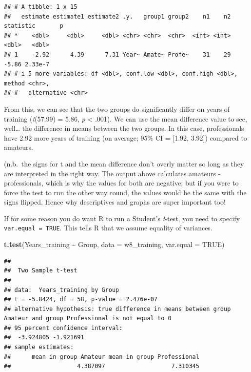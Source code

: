 \documentclass[
]{book}
\newenvironment{Shaded}{\begin{snugshade}}{\end{snugshade}}
\newcommand{\AttributeTok}[1]{\textcolor[rgb]{0.13,0.29,0.53}{#1}}
\newcommand{\ConstantTok}[1]{\textcolor[rgb]{0.56,0.35,0.01}{#1}}
\newcommand{\FunctionTok}[1]{\textcolor[rgb]{0.13,0.29,0.53}{\textbf{#1}}}
\newcommand{\NormalTok}[1]{#1}
\newcommand{\SpecialCharTok}[1]{\textcolor[rgb]{0.81,0.36,0.00}{\textbf{#1}}}
\begin{document}
\begin{verbatim}
## # A tibble: 1 x 15
##   estimate estimate1 estimate2 .y.   group1 group2    n1    n2 statistic       p
## *    <dbl>     <dbl>     <dbl> <chr> <chr>  <chr>  <int> <int>     <dbl>   <dbl>
## 1    -2.92      4.39      7.31 Year~ Amate~ Profe~    31    29     -5.86 2.33e-7
## # i 5 more variables: df <dbl>, conf.low <dbl>, conf.high <dbl>, method <chr>,
## #   alternative <chr>
\end{verbatim}

From this, we can see that the two groups do significantly differ on years of training (\emph{t}(57.99) = 5.86, \emph{p} \textless{} .001). We can use the mean difference value to see, well\ldots{} the difference in means between the two groups. In this case, professionals have 2.92 more years of training (on average; 95\% CI = {[}1.92, 3.92{]}) compared to amateurs.

(n.b.~the signs for t and the mean difference don't overly matter so long as they are interpreted in the right way. The output above calculates amateurs - professionals, which is why the values for both are negative; but if you were to force the test to run the other way round, the values would be the same with the signs flipped. Hence why descriptives and graphs are super important too!

If for some reason you do want R to run a Student's \emph{t}-test, you need to specify \texttt{var.equal\ =\ TRUE}. This tells R that we assume equality of variances.

\begin{Shaded}
\begin{Highlighting}[]
\FunctionTok{t.test}\NormalTok{(Years\_training }\SpecialCharTok{\textasciitilde{}}\NormalTok{ Group, }\AttributeTok{data =}\NormalTok{ w8\_training, }\AttributeTok{var.equal =} \ConstantTok{TRUE}\NormalTok{)}
\end{Highlighting}
\end{Shaded}

\begin{verbatim}
## 
##  Two Sample t-test
## 
## data:  Years_training by Group
## t = -5.8424, df = 58, p-value = 2.476e-07
## alternative hypothesis: true difference in means between group Amateur and group Professional is not equal to 0
## 95 percent confidence interval:
##  -3.924805 -1.921691
## sample estimates:
##      mean in group Amateur mean in group Professional 
##                   4.387097                   7.310345
\end{verbatim}
\end{document}
